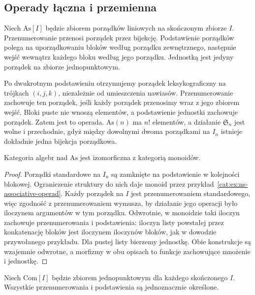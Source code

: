 \subsection{Operady łączna i przemienna}

\begin{przyklad}\label{cat:ex:symmetric-as-operad}
Niech $\mathrm{As}[I]$ będzie zbiorem porządków liniowych na skończonym zbiorze $I$. Przenumerowanie przenosi porządek przez bijekcję. Podstawienie porządków polega na uporządkowaniu bloków według porządku zewnętrznego, następnie wejść wewnątrz każdego bloku według jego porządku. Jednostką jest jedyny porządek na zbiorze jednopunktowym.
\end{przyklad}
Po dwukrotnym podstawieniu otrzymujemy porządek leksykograficzny na trójkach $(i,j,k)$, niezależnie od umieszczenia nawiasów. Przenumerowanie zachowuje ten porządek, jeśli każdy porządek przenosimy wraz z jego zbiorem wejść. Bloki puste nie wnoszą elementów, a podstawienie jednostki zachowuje porządek. Zatem jest to operada. $\mathrm{As}(n)$ ma $n!$ elementów, a działanie $\mathfrak S_n$ jest wolne i przechodnie, gdyż między dowolnymi dwoma porządkami na $I_n$ istnieje dokładnie jedna bijekcja porządkowa.

\begin{stwierdzenie}\label{cat:prop:sym-as-algebras}
Kategoria algebr nad $\mathrm{As}$ jest izomorficzna z kategorią monoidów.
\end{stwierdzenie}
\begin{proof}
Porządki standardowe na $I_n$ są zamknięte na podstawienie w kolejności blokowej. Ograniczenie struktury do nich daje monoid przez przykład~\ref{cat:ex:ns-associative-operad}. Każdy porządek na $I$ jest przenumerowaniem standardowego, więc zgodność z przenumerowaniem wymusza, by działanie jego operacji było iloczynem argumentów w tym porządku. Odwrotnie, w monoidzie taki iloczyn zachowuje przenumerowania i podstawienia: iloczyn listy powstałej przez konkatenację bloków jest iloczynem iloczynów bloków, jak w dowodzie przywołanego przykładu. Dla pustej listy bierzemy jednostkę. Obie konstrukcje są wzajemnie odwrotne, a morfizmy w obu opisach to funkcje zachowujące mnożenie i jednostkę.
\end{proof}

\begin{przyklad}\label{cat:ex:com-operad}
Niech $\mathrm{Com}[I]$ będzie zbiorem jednopunktowym dla każdego skończonego $I$. Wszystkie przenumerowania i podstawienia są jednoznacznie określone.
\end{przyklad}

